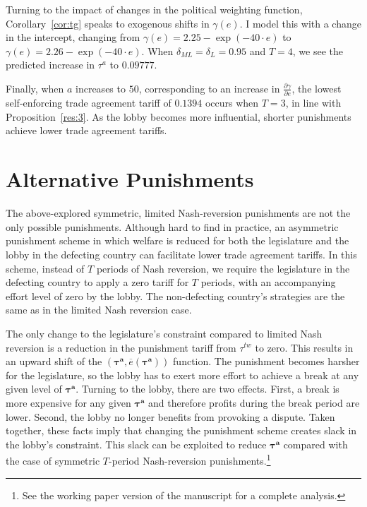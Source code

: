 \documentclass[authoryear, review]{elsarticle}
\newcommand{\ov}{\overline}
\newcommand{\bta}{\bm{\tau^a}}
\newcommand{\ga}{\gamma}
\newcommand{\de}{\delta}
\begin{document}
Turning to the impact of changes in the political weighting function, Corollary~\ref{cor:tg} speaks to exogenous shifts in $\ga(e)$. I model this with a change in the intercept, changing from $\ga(e) = 2.25 - \exp(-40\cdot e)$ to $\ga(e) = 2.26 - \exp(-40\cdot e)$. When $\de_{ML} = \de_L = 0.95$ and $T=4$, we see the predicted increase in $\tau^a$ to $0.09777$.

Finally, when $a$ increases to $50$, corresponding to an increase in $\frac{\partial \ga}{\partial e}$, the lowest self-enforcing trade agreement tariff of $0.1394$ occurs when $T=3$, in line with Proposition~\ref{res:3}. As the lobby becomes more influential, shorter punishments achieve lower trade agreement tariffs.


\section{Alternative Punishments}
\label{sec:asymmetric}
The above-explored symmetric, limited Nash-reversion punishments are not the only possible punishments. Although hard to find in practice, an asymmetric punishment scheme in which welfare is reduced for both the legislature and the lobby in the defecting country can facilitate lower trade agreement tariffs. In this scheme, instead of $T$ periods of Nash reversion, we require the legislature in the defecting country to apply a zero tariff for $T$ periods, with an accompanying effort level of zero by the lobby. The non-defecting country's strategies are the same as in the limited Nash reversion case.

The only change to the legislature's constraint compared to limited Nash reversion is a reduction in the punishment tariff from $\tau^{tw}$ to zero. This results in an upward shift of the $\left(\bta,\ov{e}\left(\bta\right) \right)$ function. The punishment becomes harsher for the legislature, so the lobby has to exert more effort to achieve a break at any given level of $\bta$. Turning to the lobby, there are two effects. First, a break is more expensive for any given $\bta$ and therefore profits during the break period are lower. Second, the lobby no longer benefits from provoking a dispute. Taken together, these facts imply that changing the punishment scheme creates slack in the lobby's constraint. This slack can be exploited to reduce $\bta$ compared with the case of symmetric $T$-period Nash-reversion punishments.\footnote{See the working paper version of the manuscript for a complete analysis.}
\end{document}
